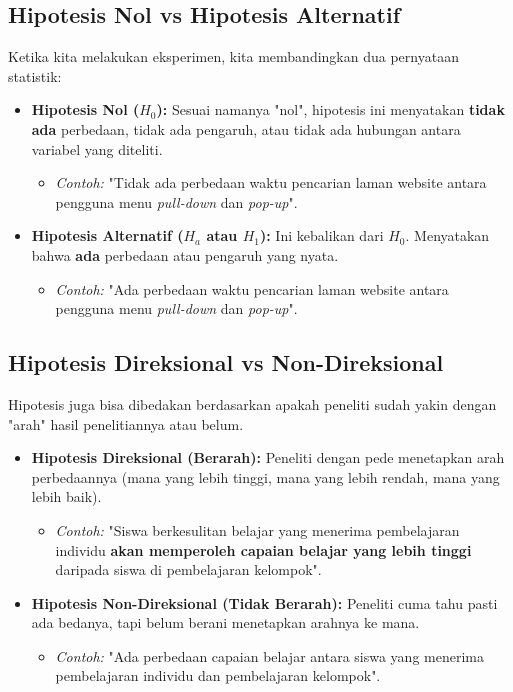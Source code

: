 \documentclass[12pt,a4paper]{article}
\begin{document}
\subsection{Hipotesis Nol vs Hipotesis Alternatif}
Ketika kita melakukan eksperimen, kita membandingkan dua pernyataan statistik:
\begin{itemize}
    \item \textbf{Hipotesis Nol ($H_0$):} Sesuai namanya "nol", hipotesis ini menyatakan \textbf{tidak ada} perbedaan, tidak ada pengaruh, atau tidak ada hubungan antara variabel yang diteliti.
    \begin{itemize}
        \item \textit{Contoh:} "Tidak ada perbedaan waktu pencarian laman website antara pengguna menu \textit{pull-down} dan \textit{pop-up}".
    \end{itemize}
    \item \textbf{Hipotesis Alternatif ($H_a$ atau $H_1$):} Ini kebalikan dari $H_0$. Menyatakan bahwa \textbf{ada} perbedaan atau pengaruh yang nyata.
    \begin{itemize}
        \item \textit{Contoh:} "Ada perbedaan waktu pencarian laman website antara pengguna menu \textit{pull-down} dan \textit{pop-up}".
    \end{itemize}
\end{itemize}

\subsection{Hipotesis Direksional vs Non-Direksional}
Hipotesis juga bisa dibedakan berdasarkan apakah peneliti sudah yakin dengan "arah" hasil penelitiannya atau belum.

\begin{itemize}
    \item \textbf{Hipotesis Direksional (Berarah):} Peneliti dengan pede menetapkan arah perbedaannya (mana yang lebih tinggi, mana yang lebih rendah, mana yang lebih baik).
    \begin{itemize}
        \item \textit{Contoh:} "Siswa berkesulitan belajar yang menerima pembelajaran individu \textbf{akan memperoleh capaian belajar yang lebih tinggi} daripada siswa di pembelajaran kelompok".
    \end{itemize}
    \item \textbf{Hipotesis Non-Direksional (Tidak Berarah):} Peneliti cuma tahu pasti ada bedanya, tapi belum berani menetapkan arahnya ke mana.
    \begin{itemize}
        \item \textit{Contoh:} "Ada perbedaan capaian belajar antara siswa yang menerima pembelajaran individu dan pembelajaran kelompok".
    \end{itemize}
\end{itemize}
\end{document}
